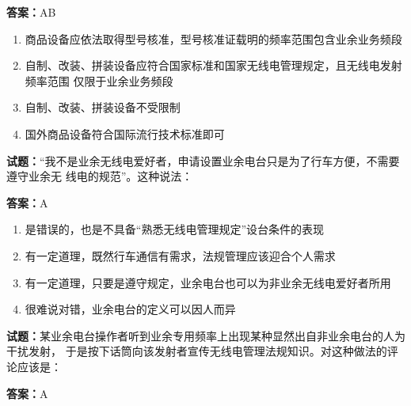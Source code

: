 \documentclass{ctexbook}
\begin{document}
\textbf{答案：}AB 

\begin{enumerate}[leftmargin=3em]
  \item 商品设备应依法取得型号核准，型号核准证载明的频率范围包含业余业务频段 

  \item 自制、改装、拼装设备应符合国家标准和国家无线电管理规定，且无线电发射频率范围
仅限于业余业务频段 

  \item 自制、改装、拼装设备不受限制 

  \item 国外商品设备符合国际流行技术标准即可 

\end{enumerate}






\vspace{1em}

\textbf{试题：}“我不是业余无线电爱好者，申请设置业余电台只是为了行车方便，不需要遵守业余无
线电的规范”。这种说法： 

\textbf{答案：}A 

\begin{enumerate}[leftmargin=3em]
  \item 是错误的，也是不具备“熟悉无线电管理规定”设台条件的表现 

  \item 有一定道理，既然行车通信有需求，法规管理应该迎合个人需求 

  \item 有一定道理，只要是遵守规定，业余电台也可以为非业余无线电爱好者所用 

  \item 很难说对错，业余电台的定义可以因人而异 

\end{enumerate}





\vspace{1em}

\textbf{试题：}某业余电台操作者听到业余专用频率上出现某种显然出自非业余电台的人为干扰发射，
于是按下话筒向该发射者宣传无线电管理法规知识。对这种做法的评论应该是： 

\textbf{答案：}A 
\end{document}
